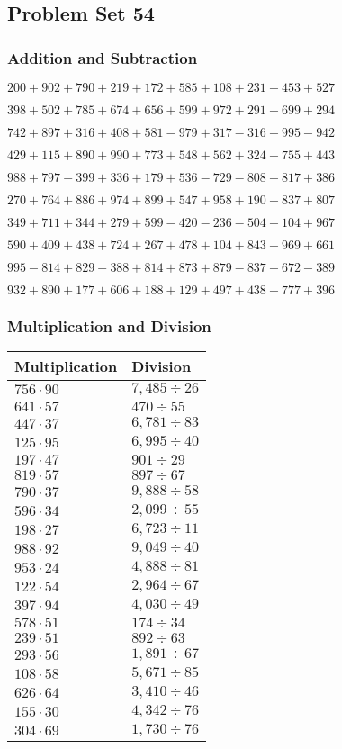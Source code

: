 \hypertarget{problem-set-54-1}{%
\subsection{Problem Set 54}\label{problem-set-54-1}}

\hypertarget{addition-and-subtraction-154}{%
\subsubsection{Addition and
Subtraction}\label{addition-and-subtraction-154}}

\(200 + 902 + 790 + 219 + 172 + 585 + 108 + 231 + 453 + 527\)

\(398 + 502 + 785 + 674 + 656 + 599 + 972 + 291 + 699 + 294\)

\(742 + 897 + 316 + 408 + 581 - 979 + 317 - 316 - 995 - 942\)

\(429 + 115 + 890 + 990 + 773 + 548 + 562 + 324 + 755 + 443\)

\(988 + 797 - 399 + 336 + 179 + 536 - 729 - 808 - 817 + 386\)

\(270 + 764 + 886 + 974 + 899 + 547 + 958 + 190 + 837 + 807\)

\(349 + 711 + 344 + 279 + 599 - 420 - 236 - 504 - 104 + 967\)

\(590 + 409 + 438 + 724 + 267 + 478 + 104 + 843 + 969 + 661\)

\(995 - 814 + 829 - 388 + 814 + 873 + 879 - 837 + 672 - 389\)

\(932 + 890 + 177 + 606 + 188 + 129 + 497 + 438 + 777 + 396\)

\hypertarget{multiplication-and-division-154}{%
\subsubsection{Multiplication and
Division}\label{multiplication-and-division-154}}

\begin{longtable}[]{@{}ll@{}}
\toprule
Multiplication & Division\tabularnewline
\midrule
\endhead
\(756 \cdot 90\) & \(7,485÷26\)\tabularnewline
\(641 \cdot 57\) & \(470÷55\)\tabularnewline
\(447 \cdot 37\) & \(6,781÷83\)\tabularnewline
\(125 \cdot 95\) & \(6,995÷40\)\tabularnewline
\(197 \cdot 47\) & \(901÷29\)\tabularnewline
\(819 \cdot 57\) & \(897÷67\)\tabularnewline
\(790 \cdot 37\) & \(9,888÷58\)\tabularnewline
\(596 \cdot 34\) & \(2,099÷55\)\tabularnewline
\(198 \cdot 27\) & \(6,723÷11\)\tabularnewline
\(988 \cdot 92\) & \(9,049÷40\)\tabularnewline
\(953 \cdot 24\) & \(4,888÷81\)\tabularnewline
\(122 \cdot 54\) & \(2,964÷67\)\tabularnewline
\(397 \cdot 94\) & \(4,030÷49\)\tabularnewline
\(578 \cdot 51\) & \(174 ÷ 34\)\tabularnewline
\(239 \cdot 51\) & \(892÷63\)\tabularnewline
\(293 \cdot 56\) & \(1,891÷67\)\tabularnewline
\(108 \cdot 58\) & \(5,671÷85\)\tabularnewline
\(626 \cdot 64\) & \(3,410÷46\)\tabularnewline
\(155 \cdot 30\) & \(4,342÷76\)\tabularnewline
\(304 \cdot 69\) & \(1,730÷76\)\tabularnewline
\bottomrule
\end{longtable}

